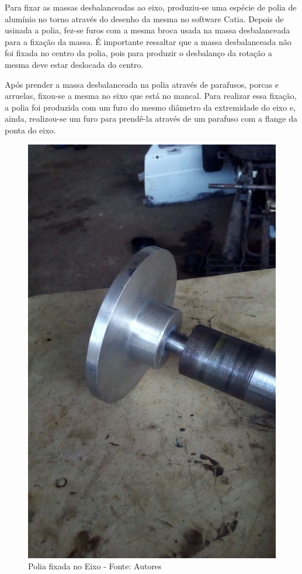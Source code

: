 Para fixar as massas desbalanceadas ao eixo, produziu-se uma espécie de polia de alumínio no torno através do desenho da mesma no software Catia. Depois de usinada a polia, fez-se furos com a mesma broca usada na massa desbalanceada para a fixação da massa. É importante ressaltar que a massa desbalanceada não foi fixada no centro da polia, pois para produzir o desbalanço da rotação a mesma deve estar deslocada do centro.

Após prender a massa desbalanceada na polia através de parafusos, porcas e arruelas, fixou-se a mesma no eixo que está no mancal. Para realizar essa fixação, a polia foi produzida com um furo do mesmo diâmetro da extremidade do eixo e, ainda, realizou-se um furo para prendê-la através de um parafuso com a flange da ponta do eixo.

  \begin{figure}[H]
      \centering
      \includegraphics[scale=0.4]{figuras/polia_eixo.jpeg}
      \caption{Polia fixada no Eixo - Fonte: Autores}
      \label{fig:polia_eixo}
  \end{figure}

